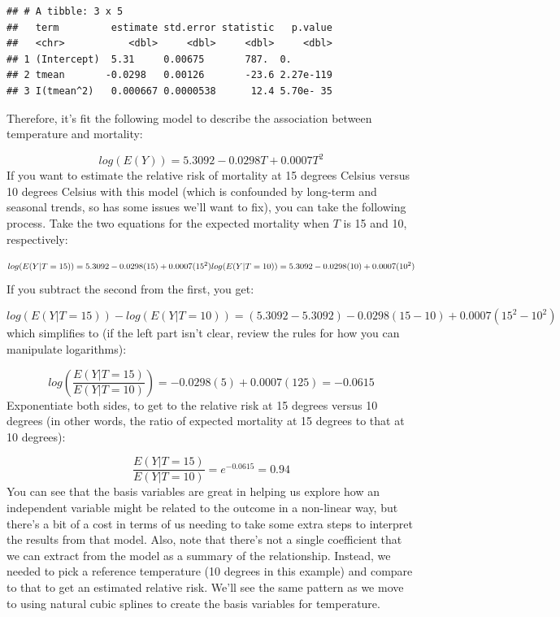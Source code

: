 \documentclass[
]{book}
\newenvironment{Shaded}{\begin{snugshade}}{\end{snugshade}}
\newcommand{\KeywordTok}[1]{\textcolor[rgb]{0.13,0.29,0.53}{\textbf{#1}}}
\newcommand{\NormalTok}[1]{#1}
\newcommand{\OperatorTok}[1]{\textcolor[rgb]{0.81,0.36,0.00}{\textbf{#1}}}
\newcommand{\StringTok}[1]{\textcolor[rgb]{0.31,0.60,0.02}{#1}}
\begin{document}
\begin{Shaded}
\end{Shaded}

\begin{verbatim}
## # A tibble: 3 x 5
##   term         estimate std.error statistic   p.value
##   <chr>           <dbl>     <dbl>     <dbl>     <dbl>
## 1 (Intercept)  5.31     0.00675       787.  0.       
## 2 tmean       -0.0298   0.00126       -23.6 2.27e-119
## 3 I(tmean^2)   0.000667 0.0000538      12.4 5.70e- 35
\end{verbatim}

Therefore, it's fit the following model to describe the association between temperature and
mortality:

\[
log(E(Y)) = 5.3092 - 0.0298T + 0.0007T^2
\]
If you want to estimate the relative risk of mortality at 15 degrees Celsius versus 10
degrees Celsius with this model (which is confounded by long-term and seasonal trends, so
has some issues we'll want to fix), you can take the following process. Take the two
equations for the expected mortality when \(T\) is 15 and 10, respectively:

\[
log(E(Y|T=15)) = 5.3092 - 0.0298(15) + 0.0007(15^2) \\
log(E(Y|T=10)) = 5.3092 - 0.0298(10) + 0.0007(10^2)  
\]
If you subtract the second from the first, you get:

\[
log(E(Y|T=15)) - log(E(Y|T=10)) = (5.3092 - 5.3092) - 0.0298(15 - 10) + 0.0007(15^2 - 10^2)
\]
which simplifies to (if the left part isn't clear, review the rules for how you can manipulate
logarithms):

\[
log(\frac{E(Y|T=15)}{E(Y|T=10)}) = - 0.0298(5) + 0.0007(125) = -0.0615
\]
Exponentiate both sides, to get to the relative risk at 15 degrees versus 10 degrees (in
other words, the ratio of expected mortality at 15 degrees to that at 10 degrees):

\[
\frac{E(Y|T=15)}{E(Y|T=10)} = e^{-0.0615} =  0.94
\]
You can see that the basis variables are great in helping us explore how an independent
variable might be related to the outcome in a non-linear way, but there's a bit of a cost
in terms of us needing to take some extra steps to interpret the results from that model.
Also, note that there's not a single coefficient that we can extract from the model as
a summary of the relationship. Instead, we needed to pick a reference temperature (10 degrees
in this example) and compare to that to get an estimated relative risk. We'll see the
same pattern as we move to using natural cubic splines to create the basis variables for
temperature.
\end{document}
